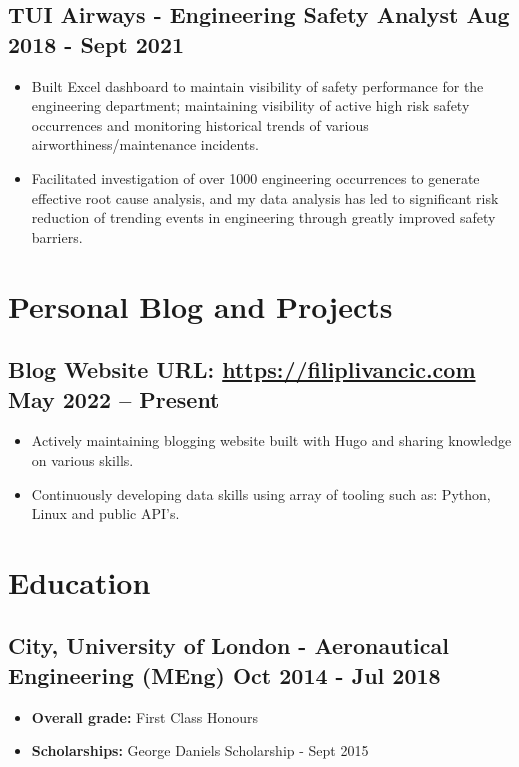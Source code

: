 \documentclass[a4paper,9pt]{article}
\begin{document}
\subsection*{\textbf{TUI Airways - Engineering Safety Analyst} \hfill  Aug 2018 - Sept 2021}
\begin{itemize}[noitemsep]
	\item Built Excel dashboard to maintain visibility of safety performance for the engineering department; maintaining visibility of active high risk safety occurrences and monitoring historical trends of various airworthiness/maintenance incidents.
	\item Facilitated investigation of over 1000 engineering occurrences to generate effective root cause analysis, and my data analysis has led to significant risk reduction of trending events in engineering through greatly improved safety barriers.
\end{itemize}

\section*{Personal Blog and Projects}

\subsection*{\textbf{Blog Website URL}: \url{https://filiplivancic.com} \hfill  May 2022 – Present}
\begin{itemize}[noitemsep]
	\item  Actively maintaining blogging website built with Hugo and sharing knowledge on various skills.
    \item  Continuously developing data skills using array of tooling such as: Python, Linux and public API's.
\end{itemize}

\section*{Education}
\subsection*{\textbf {City, University of London - Aeronautical Engineering (MEng)}  \hfill Oct 2014 - Jul 2018}\FloatBarrier
\begin{itemize}[noitemsep]
	\item \textbf{Overall grade:} First Class Honours %
    \item \textbf{Scholarships:} \hspace{0mm} George Daniels Scholarship - Sept 2015
\end{itemize}
\end{document}
